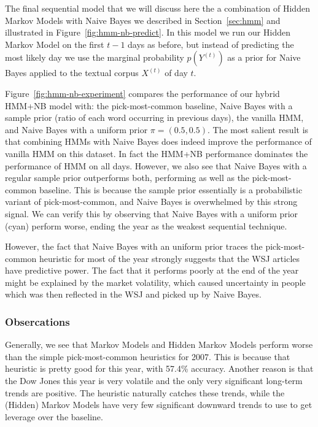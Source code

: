 \documentclass[10pt, twocolumn]{article}
\begin{document}
The final sequential model that we will discuss here the a combination of Hidden Markov Models with Naive Bayes we described in Section~\ref{sec:hmm} and illustrated in Figure~\ref{fig:hmm-nb-predict}.
In this model we run our Hidden Markov Model on the first $t-1$ days as before, but instead of predicting the most likely day we use the marginal probability $p(Y^{(t)})$ as a prior for Naive Bayes applied to the textual corpus $X^{(t)}$ of day $t$.

Figure~\ref{fig:hmm-nb-experiment} compares the performance of our hybrid HMM+NB model with: the pick-most-common baseline, Naive Bayes with a sample prior (ratio of each word occurring in previous days), the vanilla HMM, and Naive Bayes with a uniform prior $\pi=(0.5, 0.5)$.
The most salient result is that combining HMMs with Naive Bayes does indeed improve the performance of vanilla HMM on this dataset.
In fact the HMM+NB performance dominates the performance of HMM on all days.
However, we also see that Naive Bayes with a regular sample prior outperforms both, performing as well as the pick-most-common baseline.
This is because the sample prior essentially is a probabilistic variant of pick-most-common, and Naive Bayes is overwhelmed by this strong signal.
We can verify this by observing that Naive Bayes with a uniform prior (cyan) perform worse, ending the year as the weakest sequential technique.

However, the fact that Naive Bayes with an uniform prior traces the pick-most-common heuristic for most of the year strongly suggests that the WSJ articles have predictive power.
The fact that it performs poorly at the end of the year might be explained by the market volatility, which caused uncertainty in people which was then reflected in the WSJ and picked up by Naive Bayes.

\subsubsection{Obsercations}

Generally, we see that Markov Models and Hidden Markov Models perform worse than the simple pick-most-common heuristics for 2007. This is because that heuristic is pretty good for this year, with 57.4\% accuracy. Another reason is that the Dow Jones this year is very volatile and the only very significant long-term trends are positive. The heuristic naturally catches these trends, while the (Hidden) Markov Models have very few significant downward trends to use to get leverage over the baseline.
\end{document}
